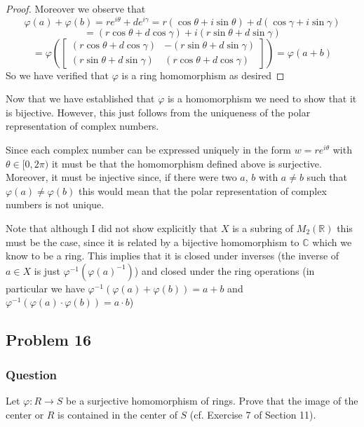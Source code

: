 \documentclass[12pt]{article}
\begin{document}
\begin{proof}
Moreover we observe that
\[
\varphi(a ) +\varphi(  b)= r e^{i \theta}+ d e^{i \gamma}= r \left( \cos{\theta}+ i \sin{\theta} \right)+ d \left( \cos{\gamma} + i \sin{\gamma} \right)
\]
\[
=  \left( r \cos{\theta}+d  \cos{\gamma} \right)+ i  \left(    r \sin{\theta}  +  d\sin{\gamma} \right)  
\]
\[
 = \varphi \left( \left[ \begin{array}{lr} \left( r \cos{\theta}+d  \cos{\gamma} \right)& - \left(    r \sin{\theta}  +  d\sin{\gamma} \right)   \\ \left(    r \sin{\theta}  +  d\sin{\gamma} \right)   &  \left( r \cos{\theta}+d  \cos{\gamma} \right) \end{array} \right]   \right)   =\varphi(a+b)
\]
So we have verified that $\varphi$ is a ring homomorphism as desired \end{proof}

Now that we have established that $\varphi$ is a homomorphism we need to show that it is bijective. However, this just follows from the uniqueness of the polar representation of complex numbers. 

Since each complex number can be expressed uniquely in the form $w = r e^{i \theta}$ with $\theta \in [0,2 \pi)$ it must be that the homomorphism defined above is surjective. Moreover, it must be injective since, if there were two $a$, $b$ with $a \neq b$ such that $\varphi(a) \neq \varphi(b)$ this would mean that the polar representation of complex numbers is not unique. 

Note that although I did not show explicitly that $X$ is a subring of $M_2(\mathbb{R})$ this must be the case, since it is related by a bijective homomorphism to $\mathbb{C}$ which we know to be a ring. This implies that it is closed under inverses (the inverse of $a \in X $ is just $\varphi^{-1}(\varphi(a)^{-1})$) and closed under the ring operations (in particular we have $\varphi^{-1}(\varphi(a)+\varphi(b))=a+b$ and $\varphi^{-1}(\varphi(a)\cdot \varphi(b))=a\cdot b$)

\subsection{Problem 16}

\subsubsection{Question}
Let $\varphi : R \to S$ be a surjective homomorphism of rings. Prove that the image of the center or $R$ is contained in the center of $S$ (cf. Exercise 7 of Section 11).
\end{document}
